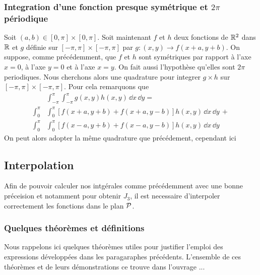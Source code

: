 \documentclass[10pt]{article}
\begin{document}
\begin{multicols}{2}
\vspace*{11pt}




\subsubsection{Integration d'une fonction presque symétrique et $2\pi$ périodique}

Soit $(a,b) \in [0,\pi]\times [0,\pi]$. Soit maintenant $f$ et $h$ deux fonctions de $\mathbb{R}^2$ dans $\mathbb{R}$ et  $g$ définie sur  $[-\pi, \pi] \times [-\pi, \pi]$ par $g : (x,y) \rightarrow f(x+a, y+b)$. On suppose, comme précédemment, que $f$ et $h$ sont symétriques par rapport à l'axe $x=0$, à l'axe $y=0$ et à l'axe $x=y$. On fait aussi l'hypothèse qu'elles sont $2\pi$ periodiques. Nous cherchons alors une quadrature pour integrer $g\times h$ sur $[-\pi, \pi] \times [-\pi, \pi]$. Pour cela remarquons que
\begin{equation}
\begin{split}
 & \int_{-\pi}^{\pi} \int_{-\pi}^{\pi} g(x,y) h(x,y) \,  \dd x \, \dd y  = \\
 \int_{0}^{\pi} & \int_{0}^{\pi} [f(x+a, y+b) + f(x+a, y-b)] h(x,y) \, \dd x \, \dd y \, + \\ 
\int_{0}^{\pi} & \int_{0}^{\pi} [f(x-a, y+b) + f(x-a, y-b)] h(x,y)  \, \dd x \, \dd y 
\end{split}
\end{equation}
On peut alors adopter la même quadrature que précédement, cependant ici 

\vspace*{11pt}


\subsection{Interpolation}


Afin de pouvoir calculer nos intgérales comme précédemment avec une bonne préceision et notamment pour obtenir $J_3$, il est necessaire d'interpoler correctement les fonctions dans le plan $\mathcal{P}$.

\subsubsection{Quelques théorèmes et définitions}

Nous rappelons ici quelques théorèmes utiles pour justifier l'emploi des expressions développées dans les paragaraphes précédents. L'ensemble de ces théorèmes et de leurs démonstrations ce trouve dans l'ouvrage ... 


\end{multicols}
\end{document}
